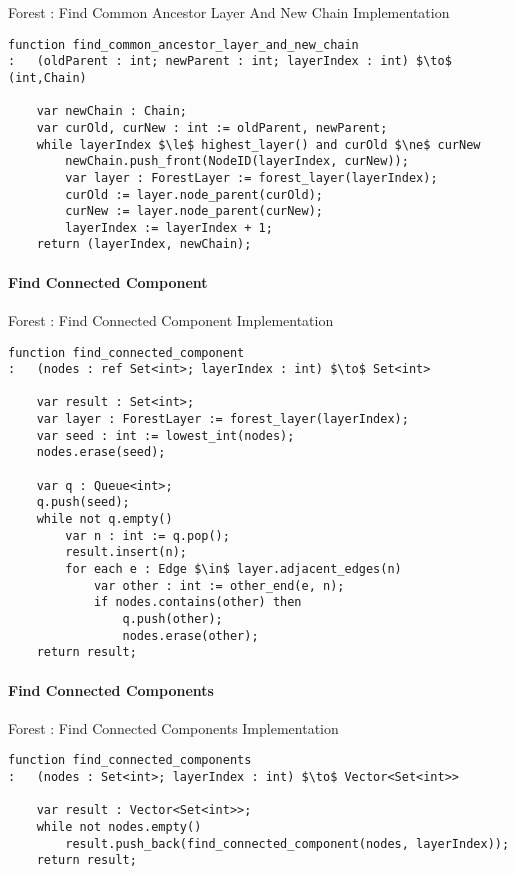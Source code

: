 \begin{stulisting}[H]
\caption{Forest : Find Common Ancestor Layer And New Chain Implementation}
\label{code:appendixpf-findcommonancestorlayerandnewchain}
\begin{lstlisting}[style=Default]
function find_common_ancestor_layer_and_new_chain
:	(oldParent : int; newParent : int; layerIndex : int) $\to$ (int,Chain)

	var newChain : Chain;
	var curOld, curNew : int := oldParent, newParent;
	while layerIndex $\le$ highest_layer() and curOld $\ne$ curNew
		newChain.push_front(NodeID(layerIndex, curNew));
		var layer : ForestLayer := forest_layer(layerIndex);
		curOld := layer.node_parent(curOld);
		curNew := layer.node_parent(curNew);
		layerIndex := layerIndex + 1;
	return (layerIndex, newChain);
\end{lstlisting}
\end{stulisting}

\paragraph{Find Connected Component}

\begin{stulisting}[H]
\caption{Forest : Find Connected Component Implementation}
\begin{lstlisting}[style=Default]
function find_connected_component
:	(nodes : ref Set<int>; layerIndex : int) $\to$ Set<int>

	var result : Set<int>;
	var layer : ForestLayer := forest_layer(layerIndex);
	var seed : int := lowest_int(nodes);
	nodes.erase(seed);

	var q : Queue<int>;
	q.push(seed);
	while not q.empty()
		var n : int := q.pop();
		result.insert(n);
		for each e : Edge $\in$ layer.adjacent_edges(n)
			var other : int := other_end(e, n);
			if nodes.contains(other) then
				q.push(other);
				nodes.erase(other);
	return result;
\end{lstlisting}
\end{stulisting}

\paragraph{Find Connected Components}

\begin{stulisting}[H]
\caption{Forest : Find Connected Components Implementation}
\begin{lstlisting}[style=Default]
function find_connected_components
:	(nodes : Set<int>; layerIndex : int) $\to$ Vector<Set<int>>

	var result : Vector<Set<int>>;
	while not nodes.empty()
		result.push_back(find_connected_component(nodes, layerIndex));
	return result;
\end{lstlisting}
\end{stulisting}

